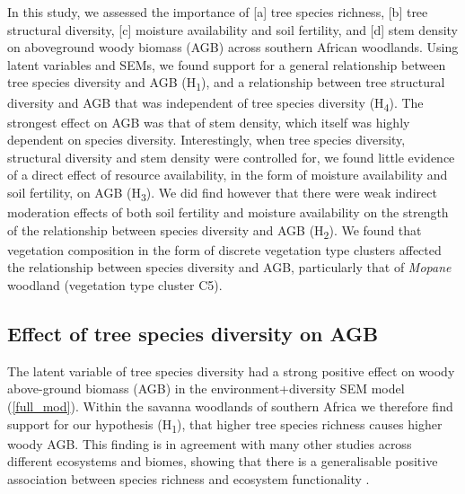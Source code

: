 \documentclass[11pt,a4paper]{article}
\begin{document}

In this study, we assessed the importance of [a] tree species richness, [b] tree structural diversity, [c] moisture availability and soil fertility, and [d] stem density on aboveground woody biomass (AGB) across southern African woodlands. Using latent variables and SEMs, we found support for a general relationship between tree species diversity and AGB (H\textsubscript{1}), and a relationship between tree structural diversity and AGB that was independent of tree species diversity (H\textsubscript{4}). The strongest effect on AGB was that of stem density, which itself was highly dependent on species diversity. Interestingly, when tree species diversity, structural diversity and stem density were controlled for, we found little evidence of a direct effect of resource availability, in the form of moisture availability and soil fertility, on AGB (H\textsubscript{3}). We did find however that there were weak indirect moderation effects of both soil fertility and moisture availability on the strength of the relationship between species diversity and AGB (H\textsubscript{2}). We found that vegetation composition in the form of discrete vegetation type clusters affected the relationship between species diversity and AGB, particularly that of \textit{Mopane} woodland (vegetation type cluster C5).

\subsection{Effect of tree species diversity on AGB}

The latent variable of tree species diversity had a strong positive effect on woody above-ground biomass (AGB) in the environment+diversity SEM model (\autoref{full_mod}). Within the savanna woodlands of southern Africa we therefore find support for our hypothesis (H\textsubscript{1}), that higher tree species richness causes higher woody AGB. This finding is in agreement with many other studies across different ecosystems and biomes, showing that there is a generalisable positive association between species richness and ecosystem functionality \citep{Liang2016, Cardinale2009}. 
\end{document}
